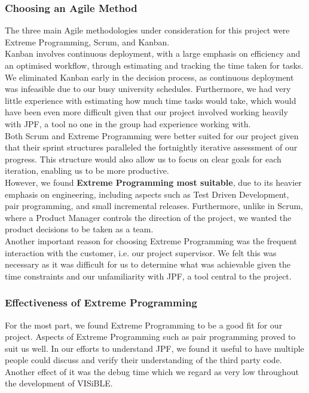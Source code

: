 \documentclass[titlepage,11pt]{article}
\begin{document}
\subsubsection{Choosing an Agile Method}
The three main Agile methodologies under consideration for this project were Extreme Programming, Scrum, and Kanban. \\

Kanban involves continuous deployment, with a large emphasis on efficiency and an optimised workflow, through estimating and tracking the time taken for tasks. We eliminated Kanban early in the decision process, as continuous deployment was infeasible due to our busy university schedules. Furthermore, we had very little experience with estimating how much time tasks would take, which would have been even more difficult given that our project involved working heavily with JPF, a tool no one in the group had experience working with. \\

Both Scrum and Extreme Programming were better suited for our project given that their sprint structures paralleled the fortnightly iterative assessment of our progress. This structure would also allow us to focus on clear goals for each iteration, enabling us to be more productive. \\

However, we found \textbf{Extreme Programming most suitable}, due to its heavier emphasis on engineering, including aspects such as Test Driven Development, pair programming, and small incremental releases. Furthermore, unlike in Scrum, where a Product Manager controls the direction of the project, we wanted the product decisions to be taken as a team. \\

Another important reason for choosing Extreme Programming was the frequent interaction with the customer, i.e. our project supervisor. We felt this was necessary as it was difficult for us to determine what was achievable given the time constraints and our unfamiliarity with JPF, a tool central to the project.

\subsubsection{Effectiveness of Extreme Programming}

For the most part, we found Extreme Programming to be a good fit for our project. Aspects of Extreme Programming such as pair programming proved to suit us well. In our efforts to understand JPF, we found it useful to have multiple people could discuss and verify their understanding of the third party code. Another effect of it was the debug time which we regard as very low throughout the development of VISiBLE. \\
\end{document}
